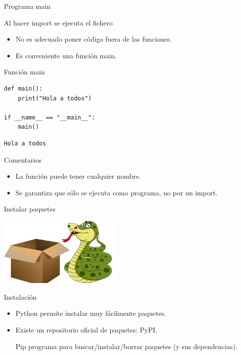 \documentclass[bigger,unknownkeysallowed]{beamer}
\begin{document}
\begin{frame}[fragile,label={sec:org088a19c}]{Programa main}
 \begin{block}{Al hacer import se ejecuta el fichero}
\begin{itemize}
\item No es adecuado poner código fuera de las funciones.

\item Es conveniente una función \alert{main}.
\end{itemize}
\end{block}

\begin{exampleblock}{Función main}
\begin{verbatim}
def main():
    print("Hola a todos")

if __name__ == "__main__":
    main()
\end{verbatim}
\scriptsize
\begin{verbatim}
Hola a todos
\end{verbatim}
\end{exampleblock}

\begin{block}{Comentarios}
\begin{itemize}
\item La función puede tener cualquier nombre.

\item Se garantiza que sólo se ejecuta como programa, no por un import.
\end{itemize}
\end{block}
\end{frame}

\begin{frame}[label={sec:org0e02e1f}]{Instalar paquetes}
\begin{center}
\begin{center}
\includegraphics[width=0.453\textwidth]{box_python.png}
\end{center}
\end{center}

\begin{block}{Instalación}
\begin{itemize}
\item Python permite instalar muy fácilmente paquetes.

\item Existe un repositorio oficial de paquetes: PyPI.

\item[{Pip}] programa para buscar/instalar/borrar paquetes (y sus dependencias).
\end{itemize}
\end{block}
\end{frame}
\end{document}
